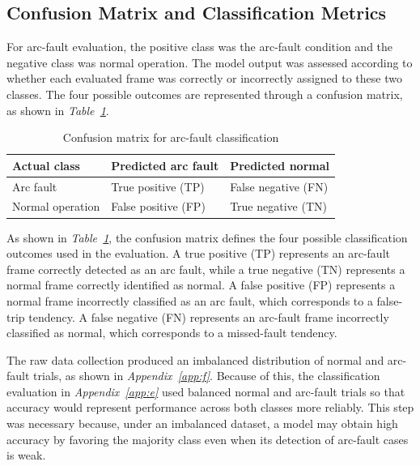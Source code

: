\subsection{Confusion Matrix and Classification Metrics}
\label{sec:ch3-classification-metrics}

For arc-fault evaluation, the positive class was the arc-fault condition and
the negative class was normal operation. The model output was assessed according
to whether each evaluated frame was correctly or incorrectly assigned to these
two classes. The four possible outcomes are represented through a confusion
matrix, as shown in \textit{Table~\ref{tab:ch3-confusion-matrix}}.

\begin{table}[H]
  \centering
  \caption{Confusion matrix for arc-fault classification}
  \label{tab:ch3-confusion-matrix}
  \begin{tabular}{@{}p{}p{}p{}@{}}
    \toprule
    \textbf{Actual class} & \textbf{Predicted arc fault} & \textbf{Predicted normal} \\
    \midrule
    Arc fault &
    True positive (TP)&
    False negative (FN)\\
    Normal operation &
    False positive (FP)&
    True negative (TN)\\
    \bottomrule
  \end{tabular}
\end{table}

As shown in \textit{Table~\ref{tab:ch3-confusion-matrix}}, the confusion matrix
defines the four possible classification outcomes used in the evaluation. A true
positive (TP) represents an arc-fault frame correctly detected as an arc fault,
while a true negative (TN) represents a normal frame correctly identified as
normal. A false positive (FP) represents a normal frame incorrectly classified
as an arc fault, which corresponds to a false-trip tendency. A false negative
(FN) represents an arc-fault frame incorrectly classified as normal, which
corresponds to a missed-fault tendency.

The raw data collection produced an imbalanced distribution of normal and
arc-fault trials, as shown in \textit{Appendix~\ref{app:f}}. Because of this,
the classification evaluation in \textit{Appendix~\ref{app:e}} used balanced
normal and arc-fault trials so that accuracy would represent performance across
both classes more reliably. This step was necessary because, under an imbalanced
dataset, a model may obtain high accuracy by favoring the majority class even
when its detection of arc-fault cases is weak.

